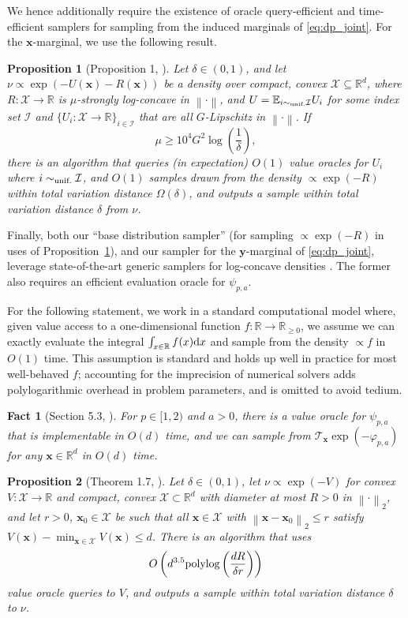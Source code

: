 \documentclass[11pt]{article}
\newtheorem{fact}{Fact}
\newtheorem{proposition}{Proposition}
\newcommand{\norm}[1]{\left\lVert#1\right\rVert}
\newcommand{\R}{\mathbb{R}}
\newcommand{\E}{\mathbb{E}}
\newcommand{\dd}{\textup{d}}
\newcommand{\polylog}{\textup{polylog}}
\newcommand{\Par}[1]{\left(#1\right)}
\newcommand{\0}{\mathbf{0}}
\newcommand{\1}{\mathbf{1}}
\newcommand{\vx}{\mathbf{x}}
\newcommand{\vy}{\mathbf{y}}
\newcommand{\calI}{\mathcal{I}}
\newcommand{\calX}{\mathcal{X}}
\newcommand{\tilt}{\mathcal{T}}
\newcommand{\vhi}{\varphi}
\newcommand{\simu}{\sim_{\textup{unif.}}}
\begin{document}
We hence additionally require the existence of oracle query-efficient and time-efficient samplers for sampling from the induced marginals of 
\eqref{eq:dp_joint}. For the $\vx$-marginal, we use the following result.

\begin{proposition}[Proposition 1, \cite{GopiLLST25}]\label{prop:reject}
Let $\delta \in (0, 1)$, and let $\nu \propto \exp(-U(\vx) - R(\vx))$ be a density over compact, convex $\calX \subseteq \R^d$, where $R: \calX \to \R$ is $\mu$-strongly log-concave in $\norm{\cdot}$, and $U = \E_{i \simu \calI} U_i$ for some index set $\calI$ and $\{U_i: \calX \to \R\}_{i \in \calI}$ that are all $G$-Lipschitz in $\norm{\cdot}$. If
\[\mu \ge 10^4 G^2 \log\Par{\frac 1 \delta},\]
there is an algorithm that queries (in expectation) $O(1)$ value oracles for $U_i$ where $i \simu \calI$, and $O(1)$ samples drawn from the density $\propto \exp(-R)$ within total variation distance $\Omega(\delta)$, and outputs a sample within total variation distance $\delta$ from $\nu$.
\end{proposition}
Finally, both our ``base distribution sampler'' (for sampling $\propto \exp(-R)$ in uses of Proposition~\ref{prop:reject}), and our sampler for the $\vy$-marginal of \eqref{eq:dp_joint}, leverage state-of-the-art generic samplers for log-concave densities \cite{KookV25a}. The former also requires an efficient evaluation oracle for $\psi_{p,a}$.

For the following statement, we work in a standard computational model where, given value access to a one-dimensional function $f: \R \to \R_{\ge 0}$, we assume we can exactly evaluate the integral $\int_{x \in \R} f(x) \dd x$ and sample from the density $\propto f$ in $O(1)$ time. This assumption is standard and holds up well in practice for most well-behaved $f$; accounting for the imprecision of numerical solvers adds polylogarithmic overhead in problem parameters, and is omitted to avoid tedium.

\begin{fact}[Section 5.3, \cite{GopiLLST25}]\label{fact:llt_eval}
For $p \in [1, 2)$ and $a > 0$, there is a value oracle for $\psi_{p, a}$ that is implementable in $O(d)$ time, and we can sample from $\tilt_{\vx} \exp(-\vhi_{p, a})$ for any $\vx \in \R^d$ in $O(d)$ time.
\end{fact}

\begin{proposition}[Theorem 1.7, \cite{KookV25a}]\label{prop:logcon_sample}
Let $\delta \in (0, 1)$, let $\nu \propto \exp(-V)$ for convex $V: \calX \to \R$ and compact, convex $\calX \subset \R^d$ with diameter at most $R > 0$ in $\norm{\cdot}_2$, and let $r > 0$, $\vx_0 \in \calX$ be such that all $\vx \in \calX$ with $\norm{\vx - \vx_0}_2 \le r$ satisfy $V(\vx) - \min_{\vx \in \calX} V(\vx) \le d$. There is an algorithm that uses
\[O\Par{d^{3.5} \polylog\Par{\frac{dR}{\delta r}}}\]
value oracle queries to $V$, and outputs a sample within total variation distance $\delta$ to $\nu$.
\end{proposition}
\end{document}
